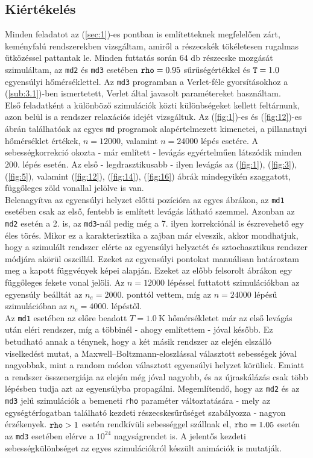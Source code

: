 \begin{multicols}{2}
\section{Kiértékelés} \label{sec:5}
Minden feladatot az (\ref{sec:1})-es pontban is említetteknek megfelelően zárt, keményfalú rendszerekben vizsgáltam, amiről a részecskék tökéletesen rugalmas ütközéssel pattantak le. Minden futtatás során $64$ db részecske mozgását szimuláltam, az \texttt{md2} és \texttt{md3} esetében $\text{\texttt{rho}} = 0.95$ sűrűségértékkel és $\text{\texttt{T}} = 1.0$ egyensúlyi hőmérséklettel. Az \texttt{md3} programban a Verlet-féle gyorsításokhoz a (\ref{sub:3.1})-ben ismertetett, Verlet által javasolt paramétereket használtam. \\
Első feladatként a különböző szimulációk közti különbségeket kellett feltárnunk, azon belül is a rendszer relaxációs idejét vizsgáltuk. Az (\ref{fig:1})-es és (\ref{fig:12})-es ábrán találhatóak az egyes \texttt{md} programok alapértelmezett kimenetei, a pillanatnyi hőmérséklet értékek, $n=12000$, valamint $n=24000$ lépés esetére. A sebességkorrekció okozta - már említett - levágás egyértelműen látszódik minden $200$. lépés esetén. Az első - legdrasztikusabb - ilyen levágás az (\ref{fig:1}), (\ref{fig:3}), (\ref{fig:5}), valamint (\ref{fig:12}), (\ref{fig:14}), (\ref{fig:16}) ábrák mindegyikén szaggatott, függőleges zöld vonallal jelölve is van. \\
Belenagyítva az egyensúlyi helyzet előtti pozícióra az egyes ábrákon, az \texttt{md1} esetében csak az első, fentebb is említett levágás látható szemmel. Azonban az \texttt{md2} esetén a 2. is, az \texttt{md3}-nál pedig még a 7. ilyen korrekciónál is észrevehető egy éles törés. Mikor ez a karakterisztika a zajban már elveszik, akkor mondhatjuk, hogy a szimulált rendszer elérte az egyensúlyi helyzetét és sztochasztikus rendszer módjára akörül oszcillál. Ezeket az egyensúlyi pontokat manuálisan határoztam meg a kapott függvények képei alapján. Ezeket az előbb felsorolt ábrákon egy függőleges fekete vonal jelöli. Az $n=12000$ lépéssel futtatott szimulációkban az egyensúly beálltát az $n_{e} = 2000$. ponttól vettem, míg az $n=24000$ lépésű szimulációban az $n_{e} = 4000$. lépéstől. \\
Az \texttt{md1} esetében az előre beadott $T = 1.0\ \text{K}$ hőmérsékletet már az első levágás után eléri rendszer, míg a többinél - ahogy említettem - jóval később. Ez betudható annak a ténynek, hogy a két másik rendszer az elején elszálló viselkedést mutat, a Maxwell--Boltzmann-eloszlással választott sebességek jóval nagyobbak, mint a random módon választott egyensúlyi helyzet körüliek. Emiatt a rendszer összenergiája az elején még jóval nagyobb, és az újraskálázás csak több lépésben tudja azt az egyensúlyba propagálni. Megemlítendő, hogy az \texttt{md2} és az \texttt{md3} jelű szimulációk a bemeneti \texttt{rho} paraméter változtatására - mely az egységtérfogatban található kezdeti részecskesűrűséget szabályozza - nagyon érzékenyek. $\text{\texttt{rho}} > 1$ esetén rendkívüli sebességgel szállnak el, $\text{\texttt{rho}} = 1.05$ esetén az \texttt{md3} esetében elérve a $10^{24}$ nagyságrendet is. A jelentős kezdeti sebességkülönbséget az egyes szimulációkról készült animációk is mutatják\cite{yt}.

\end{multicols}
